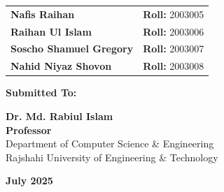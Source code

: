 \documentclass[12pt,a4paper,oneside]{book}
\begin{document}
\begin{titlepage}
\begin{minipage}{0.9\textwidth}
        \begin{tabular}{ll}
            \textbf{Nafis Raihan} & \textbf{Roll:} 2003005 \\[0.05cm]
            \textbf{Raihan Ul Islam} & \textbf{Roll:} 2003006 \\[0.05cm]
            \textbf{Soscho Shamuel Gregory} & \textbf{Roll:} 2003007 \\[0.05cm]
            \textbf{Nahid Niyaz Shovon} & \textbf{Roll:} 2003008 \\
        \end{tabular}
    \end{minipage}
    
    \vspace{1.2cm}
    \begin{minipage}{0.8\textwidth}
        \centering
        {\large\textbf{\color{chapterblue}Submitted To:}}
        \vspace{0.2cm}
        
        {\large\textbf{Dr. Md. Rabiul Islam}} \\[0.05cm]
        {\textbf{Professor}} \\[0.05cm]
        Department of Computer Science \& Engineering \\
        Rajshahi University of Engineering \& Technology
    \end{minipage}
    
    \vfill
    {\large\textbf{\color{accentgray}July 2025}}
    
    \restoregeometry
\end{titlepage}

\cleardoublepage
{}
\setcounter{page}{1}

\renewcommand{\contentsname}{\color{chapterblue}\Large Table of Contents}
\renewcommand{\cftchapfont}{\bfseries\color{chapterblue}}
\renewcommand{\cftchappagefont}{\bfseries\color{chapterblue}}
\renewcommand{\cftsecfont}{\color{sectionblue}}
\renewcommand{\cftsecpagefont}{\color{sectionblue}}
\renewcommand{\cftsubsecfont}{\color{subsectionteal}}
\renewcommand{\cftsubsecpagefont}{\color{subsectionteal}}

\pagestyle{plain}
\tableofcontents
\thispagestyle{plain}

\cleardoublepage
{}
\setcounter{page}{1}
\end{document}
